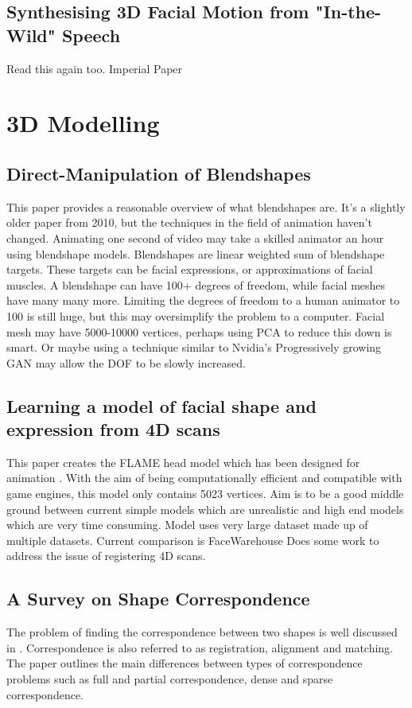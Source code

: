 \documentclass[12pt]{article}
\begin{document}
\subsection{Synthesising 3D Facial Motion from "In-the-Wild" Speech}
Read this again too.
Imperial Paper \cite{Tzirakis2019}


\section{3D Modelling}
\subsection{Direct-Manipulation of Blendshapes}
This paper \cite{Lewis2010} provides a reasonable overview of what blendshapes are.
It's a slightly older paper from 2010, but the techniques in the field of animation haven't changed.
Animating one second of video may take a skilled animator an hour using blendshape models.
Blendshapes are linear weighted sum of blendshape targets.
These targets can be facial expressions, or approximations of facial muscles.
A blendshape can have 100+ degrees of freedom, while facial meshes have many many more.
Limiting the degrees of freedom to a human animator to 100 is still huge, but this may oversimplify the problem to a computer.
Facial mesh may have 5000-10000 vertices, perhaps using PCA to reduce this down is smart.
Or maybe using a technique similar to Nvidia's Progressively growing GAN \cite{Karras2017b} may allow the DOF to be slowly increased.

\subsection{Learning a model of facial shape and expression from 4D scans}
This paper creates the FLAME head model which has been designed for animation \cite{Li2017}.
With the aim of being computationally efficient and compatible with game engines, this model only contains 5023 vertices.
Aim is to be a good middle ground between current simple models which are unrealistic and high end models which are very time consuming.
Model uses very large dataset made up of multiple datasets.
Current comparison is FaceWarehouse
Does some work to address the issue of registering 4D scans.

\subsection{A Survey on Shape Correspondence}
The problem of finding the correspondence between two shapes is well discussed in \cite{Kaick2011}.
Correspondence is also referred to as registration, alignment and matching.
The paper outlines the main differences between types of correspondence problems such as full and partial correspondence, dense and sparse correspondence.
\end{document}
